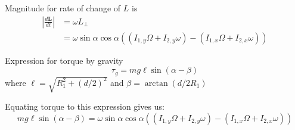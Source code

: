\documentclass{scrartcl}
\begin{document}
Magnitude for rate of change of $L$ is
\begin{equation}
    \begin{aligned}
        \left|\frac{d\mathbf{L}}{dt} \right| & =\omega L_\perp                                                                              \\
                                             & = \omega\sin\alpha\cos\alpha ((I_{1,y}\Omega +I_{2,y}\omega)-(I_{1,x}\Omega +I_{2,x}\omega))
    \end{aligned}
\end{equation}

Expression for torque by gravity
\begin{equation}
    \tau_g = mg \ell\sin(\alpha-\beta)
\end{equation}
where $\ell=\sqrt{R_1^2+(d/2)^2}$ and $\beta=\arctan(d/2R_1)$


Equating torque to this expression gives us:
\begin{equation}
    mg \ell\sin(\alpha-\beta)=\omega\sin\alpha\cos\alpha ((I_{1,y}\Omega +I_{2,y}\omega)-(I_{1,x}\Omega +I_{2,x}\omega))
\end{equation}
\end{document}
